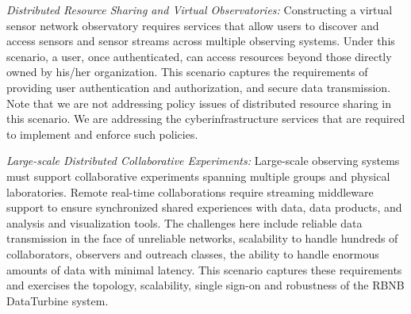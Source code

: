 \emph{Distributed Resource Sharing and Virtual Observatories:} Constructing a virtual sensor network observatory requires services that allow users to discover and access sensors and sensor streams across multiple observing systems. Under this scenario, a user, once authenticated, can access resources beyond those directly owned by his/her organization. This scenario captures the requirements of providing user authentication and authorization, and secure data transmission. Note that we are not addressing policy issues of distributed resource sharing in this scenario.  We are addressing the cyberinfrastructure services that are required to implement and enforce such policies.

\emph{Large-scale Distributed Collaborative Experiments:} Large-scale observing systems must support collaborative experiments spanning multiple groups and physical laboratories.  Remote real-time collaborations require streaming middleware support to ensure synchronized shared experiences with data, data products, and analysis and visualization tools. The challenges here include reliable data transmission in the face of unreliable networks, scalability to handle hundreds of collaborators, observers and outreach classes, the ability to handle enormous amounts of data with minimal latency.  This scenario captures these requirements and exercises the topology, scalability, single sign-on and robustness of the RBNB DataTurbine system. %
